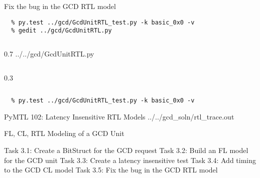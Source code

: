 \begin{task}\begin{frame}[fragile]{Fix the bug in the GCD RTL model}
\vspace{-0.25in}
\begin{Verbatim}[commandchars=\\\{\}]
  % cd    \midtilde/pymtl-tut/build
  % py.test ../gcd/GcdUnitRTL_test.py -k basic_0x0 -v
  % gedit ../gcd/GcdUnitRTL.py
\end{Verbatim}

\vspace{-0.2in}
  \begin{cbxcols}
  \begin{column}{0.7\tw}
%
{../../gcd/GcdUnitRTL.py}
  \end{column}
  \begin{column}{0.3\tw}
  \vspace{.4in}
  \end{column}
  \end{cbxcols}

\vspace{-0.3in}
\begin{verbatim}
  % py.test ../gcd/GcdUnitRTL_test.py -k basic_0x0 -v
\end{verbatim}
\end{frame}
\end{task}

\begin{frame}{PyMTL 102: Latency Insensitive RTL Models}
\vspace{-0.25in}
%
{../../gcd_soln/rtl_trace.out}

\end{frame}


\begin{frame}{ FL, CL, RTL Modeling of a GCD Unit}
\begin{cbxlist}
  \1 Task 3.1: Create a BitStruct for the GCD request
  \1 Task 3.2: Build an FL model for the GCD unit
  \1 Task 3.3: Create a latency insensitive test
  \1 Task 3.4: Add timing to the GCD CL model
  \1 Task 3.5: Fix the bug in the GCD RTL model
  \1 
  \1 
\end{cbxlist}
\end{frame}

